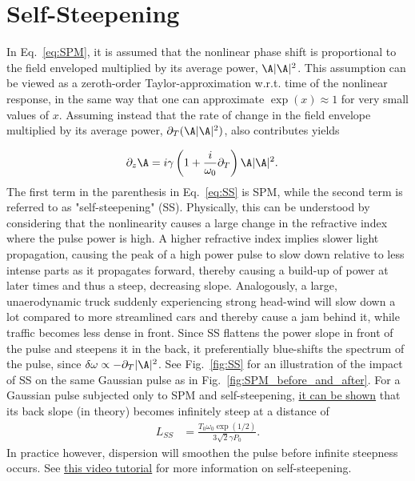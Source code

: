 \section{Self-Steepening}
\label{sec:SS}
In Eq.~\ref{eq:SPM}, it is assumed that the nonlinear phase shift is proportional to the field enveloped multiplied by its average power, $\A|\A|^2$. This assumption can be viewed as a zeroth-order Taylor-approximation w.r.t. time of the nonlinear response, in the same way that one can approximate $\exp(x)\approx 1$ for very small values of $x$. Assuming instead that the rate of change in the field envelope multiplied by its average power, $\partial_T(\A|\A|^2)$, also contributes yields

\begin{align}
\label{eq:SS}
    \partial_z\A &= i\gamma\left(1+\frac{i}{\omega_0}\partial_T \right)\A|\A|^2.
\end{align}
The first term in the parenthesis in Eq.~\ref{eq:SS} is SPM, while the second term is referred to as "self-steepening" (SS). Physically, this can be understood by considering that the nonlinearity causes a large change in the refractive index where the pulse power is high. A higher refractive index implies slower light propagation, causing the peak of a high power pulse to slow down relative to less intense parts as it propagates forward, thereby causing a build-up of power at later times and thus a steep, decreasing slope. Analogously, a large, unaerodynamic truck suddenly experiencing strong head-wind will slow down a lot compared to more streamlined cars and thereby cause a jam behind it, while traffic becomes less dense in front. Since SS flattens the power slope in front of the pulse and steepens it in the back, it preferentially blue-shifts the spectrum of the pulse, since $\delta\omega\propto -\partial_T|\A|^2$. See Fig.~\ref{fig:SS} for an illustration of the impact of SS on the same Gaussian pulse as in Fig.~\ref{fig:SPM_before_and_after}. For a Gaussian pulse subjected only to SPM and self-steepening, \href{https://prefetch.eu/know/concept/self-steepening/}{it can be shown} that its back slope (in theory) becomes infinitely steep at a distance of
\begin{align}
    L_{SS} &= \frac{T_0\omega_0\exp(1/2)}{3\sqrt{2}\gamma P_0}.
\end{align}
In practice however, dispersion will smoothen the pulse before infinite steepness occurs. See \href{https://youtu.be/Fr6yLtGZ2To}{this video tutorial} for more information on self-steepening. 

